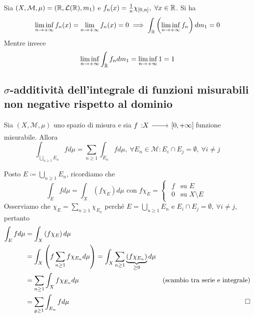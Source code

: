 \begin{examplewt}
	Sia $\left(X,\mathcal{M},\mu\right)=\left(\mathbb{R},\mathcal{L}(\mathbb{R}),m_1\right)$ e $f_n(x)=\frac{1}{n}\chi_{\left[0,n\right]},\ \forall x\in\realset$.	Si ha
	\begin{equation*}
		\liminf_{n\to+\infty}f_n(x)=\lim_{n\to+\infty}f_n(x)=0\\
		\implies\int_{\mathbb{R}}\left(\liminf_{n\to+\infty}f_n\right)dm_1=0
	\end{equation*}
	Mentre invece
	\begin{equation*}
		\liminf_{n\to+\infty}\int_{\mathbb{R}}f_ndm_1=\liminf_{n\to+\infty}1=1
	\end{equation*}
\end{examplewt}
\subsection{{$\sigma$}-additività dell'integrale di funzioni misurabili non negative rispetto al dominio}
\begin{proposition}
Sia $\left(X,\mathcal{M},\mu\right)$ uno spazio di misura e sia $\funz{f}{X}{\left[0,+\infty\right]}$ funzione misurabile.
Allora
\begin{equation}
	\int_{\bigcup_{n\geq 1}E_n}fd\mu=\sum_{n\geq 1}\int_{E_n}fd\mu,\ \forall E_n\in \mathcal{M}\colon E_i\cap E_j=\emptyset,\ \forall i\neq j
\end{equation}
\end{proposition}
\begin{demonstration}
	Posto $\displaystyle E\coloneqq \bigcup_{n\geq 1}E_n$, ricordiamo che
	\begin{equation*}
		\int_Efd\mu=\int_X\left(f\chi_E\right)d\mu\text{ con }f\chi_E=\begin{cases}
			\begin{array}{ll}
				f&\text{su }E\\
				0&\text{su }X\setminus E
			\end{array}
		\end{cases}
	\end{equation*}
Osserviamo che $\displaystyle \chi_E=\sum_{n\geq 1}\chi_{E_n}$ perché $\displaystyle E=\bigcup_{n\geq 1}E_n$ e $ E_i\cap E_j=\emptyset,\ \forall i\neq j$, pertanto
\begin{align*}
	\int_Efd\mu&=\int_X\left(f\chi_E\right)d\mu\\
	&=\int_X\left(f\sum_{n\geq 1}f\chi_{E_n}d\mu\right)=\int_X\sum_{n\geq 1}\underbrace{\left(f\chi_{E_n}\right)}_{\geq 0}d\mu\\
	&=\sum_{n\geq 1}\int_Xf\chi_{E_n}d\mu&\text{(scambio tra serie e integrale)}\\
	&=\sum_{g\geq 1}\int_{E_n}fd\mu&\qedhere
\end{align*}
\end{demonstration}
